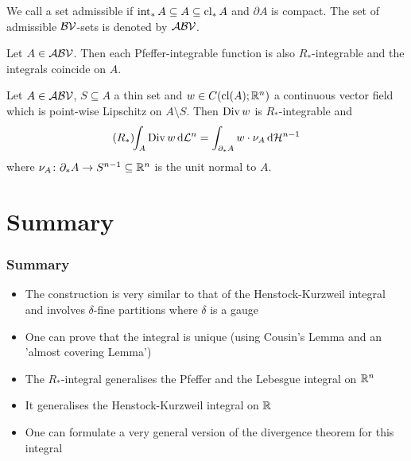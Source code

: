 \begin{frame}
	\begin{definition}
	We call a set admissible if $\operatorname{int}_*A\subseteq A\subseteq \operatorname{cl}_*A$ and $\partial A$ is compact. The set of admissible $\mathcal{BV}$-sets is denoted by $\mathcal{ABV}$.
	\end{definition}
	
	\begin{proposition}\label{pr:GeneralisationPfeffer}
	Let $A\in\mathcal{ABV}$. Then each Pfeffer-integrable function is also $R_*$-integrable and the integrals coincide on $A$.
	\end{proposition}
\end{frame}

\begin{frame}
	\begin{theorem}
	Let $A\in\mathcal{ABV}$, $S\subseteq A$ a thin set and $w\in C(\operatorname{cl}(A);\mathbb{R}^n)$ a continuous vector field which is point-wise Lipschitz on $A\setminus S$. Then $\operatorname{Div} w$ is $R_*$-integrable and
	\begin{align*}
		(R_*)\!\!\int_A\operatorname{Div} w\,\mathrm{d} \mathcal{L}^n=\int_{\partial_* A}w\cdot \nu_A\,\mathrm{d} \mathcal{H}^{n-1}
	\end{align*}
	where $\nu_A\colon \partial_* A\to S^{n-1}\subseteq\mathbb{R}^n$ is the unit normal to $A$.
	\end{theorem}
\end{frame}


\section{Summary}
\begin{frame}
	\frametitle{Summary}
	\begin{itemize}
		\item The construction is very similar to that of the Henstock-Kurzweil integral and involves $\delta$-fine partitions where $\delta$ is a gauge
		\item One can prove that the integral is unique (using Cousin's Lemma and an 'almost covering Lemma')
		\item The $R_*$-integral generalises the Pfeffer and the Lebesgue integral on $\mathbb{R}^n$
		\item It generalises the Henstock-Kurzweil integral on $\mathbb{R}$
		\item One can formulate a very general version of the divergence theorem for this integral
	\end{itemize}
\end{frame}

